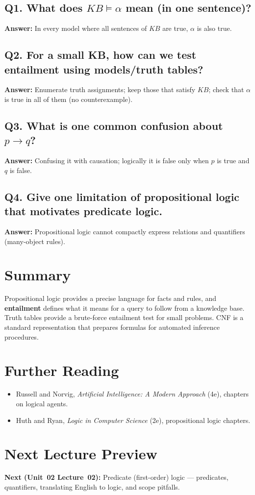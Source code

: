 \documentclass[11pt]{article}
\begin{document}
\subsection*{Q1. What does $KB \models \alpha$ mean (in one sentence)?}
\textbf{Answer:} In every model where all sentences of $KB$ are true, $\alpha$ is also true.

\subsection*{Q2. For a small KB, how can we test entailment using models/truth tables?}
\textbf{Answer:} Enumerate truth assignments; keep those that satisfy $KB$; check that $\alpha$ is true in all of them (no counterexample).

\subsection*{Q3. What is one common confusion about $p \rightarrow q$?}
\textbf{Answer:} Confusing it with causation; logically it is false only when $p$ is true and $q$ is false.

\subsection*{Q4. Give one limitation of propositional logic that motivates predicate logic.}
\textbf{Answer:} Propositional logic cannot compactly express relations and quantifiers (many-object rules).

\section{Summary}
Propositional logic provides a precise language for facts and rules, and \textbf{entailment} defines what it means for a query to follow from a knowledge base.
Truth tables provide a brute-force entailment test for small problems.
CNF is a standard representation that prepares formulas for automated inference procedures.
\notesources{\AIMLUnitIISources}

\section{Further Reading}
\begin{itemize}[leftmargin=*]
  \item Russell and Norvig, \textit{Artificial Intelligence: A Modern Approach} (4e), chapters on logical agents.
  \item Huth and Ryan, \textit{Logic in Computer Science} (2e), propositional logic chapters.
\end{itemize}
\notesources{\AIMLUnitIISources}

\section{Next Lecture Preview}
\textbf{Next (Unit~02 Lecture~02):} Predicate (first-order) logic --- predicates, quantifiers, translating English to logic, and scope pitfalls.
\end{document}
